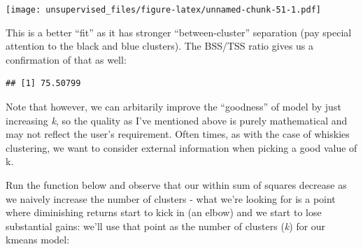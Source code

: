 \documentclass[]{article}
\newenvironment{Shaded}{\begin{snugshade}}{\end{snugshade}}
\newcommand{\CommentTok}[1]{\textcolor[rgb]{0.56,0.35,0.01}{\textit{#1}}}
\newcommand{\ControlFlowTok}[1]{\textcolor[rgb]{0.13,0.29,0.53}{\textbf{#1}}}
\newcommand{\DataTypeTok}[1]{\textcolor[rgb]{0.13,0.29,0.53}{#1}}
\newcommand{\DecValTok}[1]{\textcolor[rgb]{0.00,0.00,0.81}{#1}}
\newcommand{\KeywordTok}[1]{\textcolor[rgb]{0.13,0.29,0.53}{\textbf{#1}}}
\newcommand{\NormalTok}[1]{#1}
\newcommand{\OperatorTok}[1]{\textcolor[rgb]{0.81,0.36,0.00}{\textbf{#1}}}
\newcommand{\StringTok}[1]{\textcolor[rgb]{0.31,0.60,0.02}{#1}}
\begin{document}
\texttt{[image: unsupervised\_files/figure-latex/unnamed-chunk-51-1.pdf]}

This is a better ``fit'' as it has stronger ``between-cluster''
separation (pay special attention to the black and blue clusters). The
BSS/TSS ratio gives us a confirmation of that as well:

\begin{Shaded}
\end{Shaded}

\begin{verbatim}
## [1] 75.50799
\end{verbatim}

Note that however, we can arbitarily improve the ``goodness'' of model
by just increasing \emph{k}, so the quality as I've mentioned above is
purely mathematical and may not reflect the user's requirement. Often
times, as with the case of whiskies clustering, we want to consider
external information when picking a good value of k.

Run the function below and observe that our within sum of squares
decrease as we naively increase the number of clusters - what we're
looking for is a point where diminishing returns start to kick in (an
elbow) and we start to lose substantial gains: we'll use that point as
the number of clusters (\emph{k}) for our kmeans model:

\begin{Shaded}
\end{Shaded}
\end{document}
